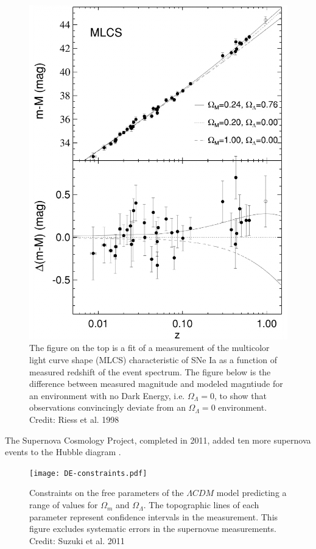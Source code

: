 \documentclass{paper}
\begin{document}
  \begin{figure}[!htb]
    \begin{centering}
    \includegraphics[scale=0.4]{DE-sn_lightcurve.pdf}
    \caption{The figure on the top is a fit of a measurement of the multicolor 
      light curve shape (MLCS) characteristic of SNe Ia as a function of 
      measured redshift of the event spectrum. The figure below is the
      difference between measured magnitude and modeled magntiude for an 
      environment with no Dark Energy, i.e. \(\Omega_{\Lambda} = 0\), to show
      that observations convincingly deviate from an \(\Omega_{\Lambda} = 0\) 
      environment.
    Credit: Riess et al. 1998}
    \label{fig:DE-sn_lightcurve}
    \end{centering}
  \end{figure}


  The Supernova Cosmology Project, completed in 2011, added ten more supernova 
  events to the Hubble diagram \cite{2012ApJ...746...85S}.
  \begin{figure}[!htb]
    \begin{centering}
    \texttt{[image: DE-constraints.pdf]}
    \caption{Constraints on the free parameters of the \(\Lambda CDM\)
      model predicting a range of values for \(\Omega_{m}\) and 
      \(\Omega_{\Lambda}\). The topographic lines of each parameter represent 
      confidence intervals in the measurement. This figure excludes systematic
      errors in the supernovae measurements.
    Credit: Suzuki et al. 2011}
    \label{fig:DE-constraints}
    \end{centering}
  \end{figure}
\end{document}
